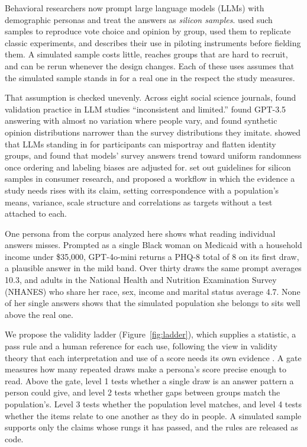 
Behavioral researchers now prompt large language models (LLMs) with demographic personas and treat the answers as \emph{silicon samples}.
\citet{argyle2023outofone} used such samples to reproduce vote choice and opinion by group, \citet{park2024diminished} used them to replicate classic experiments, and \citet{lin2026simulators} describes their use in piloting instruments before fielding them.
A simulated sample costs little, reaches groups that are hard to recruit, and can be rerun whenever the design changes.
Each of these uses assumes that the simulated sample stands in for a real one in the respect the study measures.

That assumption is checked unevenly.
Across eight social science journals, \citet{desai2026validating} found validation practice in LLM studies ``inconsistent and limited.''
\citet{park2024diminished} found GPT-3.5 answering with almost no variation where people vary, and \citet{bisbee2024synthetic} found synthetic opinion distributions narrower than the survey distributions they imitate.
\citet{wang2025misportray} showed that LLMs standing in for participants can misportray and flatten identity groups, and \citet{dominguezolmedo2024questioning} found that models' survey answers trend toward uniform randomness once ordering and labeling biases are adjusted for.
\citet{sarstedt2024silicon} set out guidelines for silicon samples in consumer research, and \citet{lin2026workflow} proposed a workflow in which the evidence a study needs rises with its claim, setting correspondence with a population's means, variance, scale structure and correlations as targets without a test attached to each.

One persona from the corpus analyzed here shows what reading individual answers misses.
Prompted as a single Black woman on Medicaid with a household income under \$35,000, GPT-4o-mini returns a PHQ-8 total of 8 on its first draw, a plausible answer in the mild band. %
Over thirty draws the same prompt averages 10.3, and adults in the National Health and Nutrition Examination Survey (NHANES) who share her race, sex, income and marital status average 4.7. %
None of her single answers shows that the simulated population she belongs to sits well above the real one.

We propose the validity ladder (Figure~\ref{fig:ladder}), which supplies a statistic, a pass rule and a human reference for each use, following the view in validity theory that each interpretation and use of a score needs its own evidence \citep{messick1995validity,kane2013validating,lin2026constructs}.
A gate measures how many repeated draws make a persona's score precise enough to read.
Above the gate, level 1 tests whether a single draw is an answer pattern a person could give, and level 2 tests whether gaps between groups match the population's.
Level 3 tests whether the population level matches, and level 4 tests whether the items relate to one another as they do in people.
A simulated sample supports only the claims whose rungs it has passed, and the rules are released as code.

